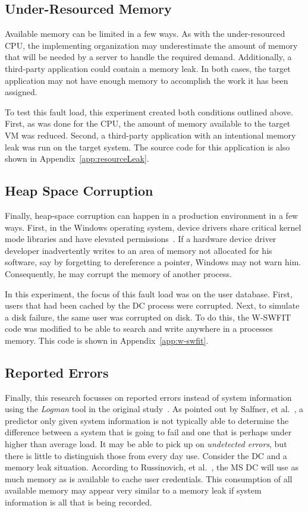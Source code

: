 \subsection{Under-Resourced Memory} \label{sec:extUnderResourcedMem}
Available memory can be limited in a few ways.  As with the under-resourced
\ac{CPU}, the implementing organization may underestimate the amount of memory
that will be needed by a server to handle the required demand.  Additionally, a
third-party application could contain a memory leak.  In both cases, the target
application may not have enough memory to accomplish the work it has been
assigned.

To test this fault load, this experiment created both conditions outlined
above. First, as was done for the \ac{CPU}, the amount of memory available to
the target \ac{VM} was reduced.  Second, a third-party application with an
intentional memory leak was run on the target system.  The source code for this
application is also shown in Appendix~\ref{app:resourceLeak}.

\subsection{Heap Space Corruption} \label{sec:extHeapSpaceCorrupt}
Finally, heap-space corruption can happen in a production environment in a few
ways.  First, in the Windows operating system, device drivers share critical
kernel mode libraries and have elevated permissions~\cite{russinovich2009}.  If
a hardware device driver developer inadvertently writes to an area of memory
not allocated for his software, say by forgetting to dereference a pointer,
Windows may not warn him.  Consequently, he may corrupt the memory of another
process.

In this experiment, the focus of this fault load was on the user database.
First, users that had been cached by the \ac{DC} process were corrupted.  Next,
to simulate a disk failure, the same user was corrupted on disk.  To do this,
the \ac{W-SWFIT} code was modified to be able to search and write anywhere in a
processes memory.  This code is shown in Appendix~\ref{app:w-swfit}.

\subsection{Reported Errors} \label{sec:extReportedErrors}
Finally, this research focusses on reported errors instead of system
information using the \emph{Logman} tool in the original
study~\cite{irrera2015}.  As pointed out by Salfner, et
al.~\cite{salfnerSurvey}, a predictor only given system information is not
typically able to determine the difference between a system that is going to
fail and one that is perhaps under higher than average load.  It may be able to
pick up on \emph{undetected errors}, but there is little to distinguish those
from every day use.  Consider the \ac{DC} and a memory leak situation.
According to Russinovich, et al.~\cite{russinovich2009}, the \ac{MS} \ac{DC}
will use as much memory as is available to cache user credentials.  This
consumption of all available memory may appear very similar to a memory leak if
system information is all that is being recorded.

